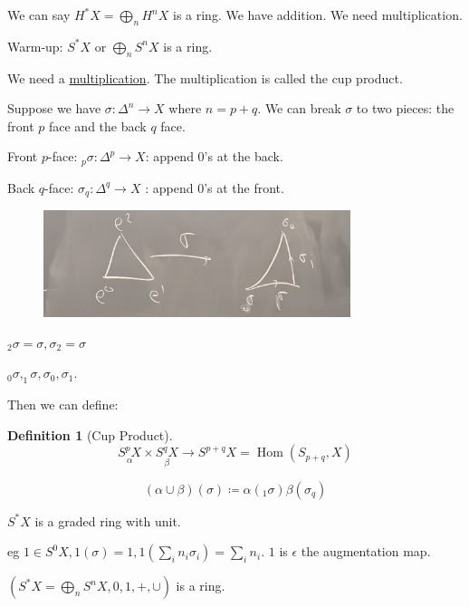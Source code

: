 \documentclass{article}
\theoremstyle{definition}
\newtheorem*{definition}{Definition}
\begin{document}
    We can say \(H^{\ast} X = \bigoplus_{n} H^n X\) is a ring. We have addition. We need multiplication.

    Warm-up: \(S^{\ast} X\) or \(\bigoplus_{n} S^n X\) is a ring.

    We need a \underline{multiplication}. The multiplication is called the cup product.

    Suppose we have \(\sigma : \Delta^n \to X\) where \(n = p+q\). We can break \(\sigma\) to two pieces: the front \(p\) face and the back \(q\) face.

    Front \(p\)-face: \(_p \sigma: \Delta^p \to X\): append \(0\)'s at the back.
    
    Back \(q\)-face: \(\sigma_q: \Delta^q \to X\) : append \(0\)'s at the front.

    \begin{figure}[H]
        \centering
        \includegraphics[width=0.8\textwidth]{img/frontback}
    \end{figure}

    \(_2 \sigma  = \sigma, \sigma_2 = \sigma\) 

    \(_0 \sigma , _1 \sigma , \sigma_0, \sigma_1\).

    Then we can define:

    \begin{definition}
        [Cup Product]

        \[
            \underset{\alpha}{S^p X} \times \underset{\beta}{S^q X} \to S^{p+q} X = \operatorname{Hom}(S_{p+q}, X)
        \]

        \[
            (\alpha \cup \beta)(\sigma) \coloneqq \alpha(_1 \sigma) \beta(\sigma_q)
        \]

        \(S^{\ast} X\) is a graded ring with unit.

        eg \(1 \in S^0 X, 1(\sigma) = 1, 1 \left( \sum_{i} n_i \sigma_i \right) = \sum_{i} n_i\). \(1\) is \(\epsilon\) the augmentation map.
    \end{definition}

    \((S^{\ast} X = \bigoplus_{n} S^n X, 0,1,+,\cup)\) is a ring.
\end{document}

